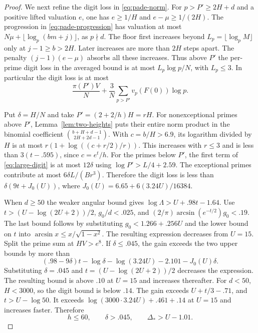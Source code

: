 \begin{proof}
We next refine the digit loss in \eqref{eq:pade-norm}.
For \(p>P'\ge2H+d\) and a positive lifted valuation \(e\),
one has \(e\ge1/H\) and \(e-\mu\ge1/(2H)\).
The progression in \eqref{eq:pade-progression} has valuation
at most \(N\mu+\lfloor\log_p(bm+j)\rfloor\), as \(p\nmid d\).
The floor first increases beyond \(L_p=\lfloor\log_p M\rfloor\)
only at \(j-1\ge b>2H\). Later increases are more than \(2H\)
steps apart. The penalty \((j-1)(e-\mu)\) absorbs all these
increases. Thus above \(P'\) the per-prime digit loss in the
averaged bound is at most \(L_p\log p/N\), with \(L_p\le3\).
In particular the digit loss is at most
\begin{equation}\label{eq:large-digit}
 \frac{\pi(P')V}{N}+\frac3N\sum_{p>P'}v_p(F(0))\log p .
\end{equation}

Put \(\delta=H/N\) and take \(P'=(2+2/h)H=rH\).
For nonexceptional primes above \(P'\),
Lemma~\ref{lem:two-heights} puts their entire norm product
in the binomial coefficient
\(\binom{b+H+d-1}{2H+2d-1}\).
With \(c=b/H>6.9\), its logarithm divided by \(H\) is at most
\(r(1+\log((c+r/2)/r))\). This increases with \(r\le3\) and is
less than \(3(t-.595)\), since \(c=e^t/h\). For the primes
below \(P'\), the first term of \eqref{eq:large-digit} is
at most \(12\delta\) using \(\log P'>L/4+2.59\).
The exceptional primes contribute at most \(6\delta L/(Br^3)\).
Therefore the digit loss is less than
\(\delta(9t+J_0(U))\), where \(J_0(U)=6.65+6(3.24U)/16384\).

When \(d\ge50\) the weaker angular bound gives
\(\log\Lambda>U+.98t-1.64\).
Use \(t>(U-\log(2U+2))/2\), \(g_0/d<.025\), and
\((2/\pi)\arcsin(e^{-t/2})g_0<.19\).
The last bound follows by substituting \(g_0<1.266+.256U\)
and the lower bound on \(t\) into
\(\arcsin x\le x/\sqrt{1-x^2}\). The resulting expression
decreases from \(U=15\). Split the prime sum at \(HV>e^8\).
If \(\delta\le .045\), the gain exceeds the two upper bounds
by more than
\[
 (.98-9\delta)t-\log\delta-\log(3.24U)-2.101-J_0(U)\delta.
\]
Substituting \(\delta=.045\) and \(t=(U-\log(2U+2))/2\)
decreases the expression. The resulting bound is above \(.10\)
at \(U=15\) and increases thereafter.
For \(d<50\), \(H<3000\), so the digit bound is below \(.14\).
The gain exceeds \(U+t/3-.71\), and \(t>U-\log50\).
It exceeds \(\log(3000\cdot3.24U)+.461+.14\) at \(U=15\) and
increases faster. Therefore
\begin{equation}\label{eq:large-degree}
 h\le60,\qquad \delta>.045,\qquad \Delta_*>U-1.01 .
\end{equation}


\end{proof}
